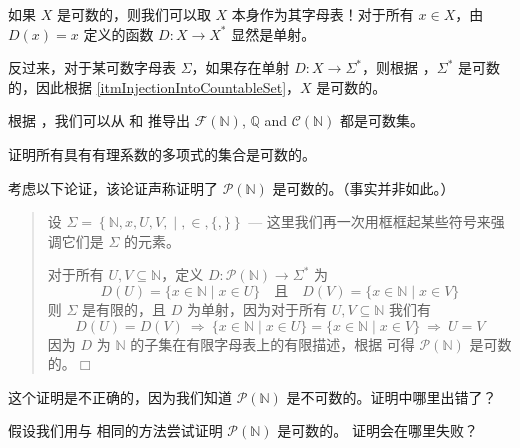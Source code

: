 \begin{cproof}
如果 $X$ 是可数的，则我们可以取 $X$ 本身作为其字母表！对于所有 $x \in X$，由 $D(x) = x$ 定义的函数 $D : X \to X^*$ 显然是单射。

反过来，对于某可数字母表 $\Sigma$，如果存在单射 $D : X \to \Sigma^*$，则根据 ，$\Sigma^*$ 是可数的，因此根据 \ref{itmInjectionIntoCountableSet}，$X$ 是可数的。
\end{cproof}

\begin{example}
根据 ，我们可以从  和  推导出 $\mathcal{F}(\mathbb{N})$, $\mathbb{Q}$ and $\mathcal{C}(\mathbb{N})$ 都是可数集。
\end{example}

\begin{exercise}
证明所有具有有理系数的多项式的集合是可数的。
\end{exercise}

\begin{exercise}
考虑以下论证，该论证声称证明了 $\mathcal{P}(\mathbb{N})$ 是可数的。（事实并非如此。）
\begin{quote}
设 $\Sigma = \left\{ \mathbb{N},x,U,V,\boxed{\mid},\boxed{\in},\boxed{\{},\boxed{\}} \right\}$ --- 这里我们再一次用框框起某些符号来强调它们是 $\Sigma$ 的元素。

对于所有 $U, V \subseteq \mathbb{N}$，定义 $D : \mathcal{P}(\mathbb{N}) \to \Sigma^*$ 为
\[ D(U) = \{ x \in \mathbb{N} \mid x \in U \} \quad \text{且} \quad D(V) = \{ x \in \mathbb{N} \mid x \in V \} \]
则 $\Sigma$ 是有限的，且 $D$ 为单射，因为对于所有 $U,V \subseteq \mathbb{N}$ 我们有
\[ D(U) = D(V) ~ \Rightarrow ~ \{ x \in \mathbb{N} \mid x \in U \} = \{ x \in \mathbb{N} \mid x \in V \} ~ \Rightarrow ~ U = V \]
因为 $D$ 为 $\mathbb{N}$ 的子集在有限字母表上的有限描述，根据  可得 $\mathcal{P}(\mathbb{N})$ 是可数的。\hfill $\Box$
\end{quote}
这个证明是不正确的，因为我们知道 $\mathcal{P}(\mathbb{N})$ 是不可数的。证明中哪里出错了？
\end{exercise}

\begin{exercise}
假设我们用与  相同的方法尝试证明 $\mathcal{P}(\mathbb{N})$ 是可数的。
证明会在哪里失败？
\end{exercise}


